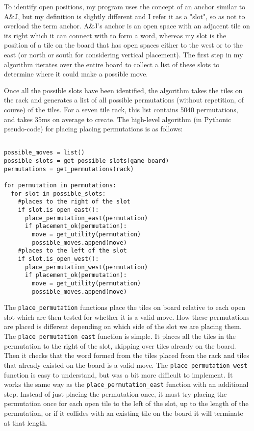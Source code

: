 \documentclass[letterpaper]{article}
\begin{document}
To identify open positions, my program uses the concept of an anchor similar to A\&J, but my definition is slightly different and I refer it as a "slot", so as not to overload the term anchor. A\&J's anchor is an open space with an adjacent tile on its right which it can connect with to form a word, whereas my slot is the position of a tile on the board that has open spaces either to the west or to the east (or north or south for considering vertical placement). The first step in my algorithm iterates over the entire board to collect a list of these slots to determine where it could make a possible move.

Once all the possible slots have been identified, the algorithm takes the tiles on the rack and generates a list of all possible permutations (without repetition, of course) of the tiles. For a seven tile rack, this list contains 5040 permutations, and takes 35ms on average to create. The high-level algorithm (in Pythonic pseudo-code) for placing placing permutations is as follows:

\lstset{language=Python}
\begin{lstlisting}[frame=single, breaklines=true]  % Start your code-block

possible_moves = list()
possible_slots = get_possible_slots(game_board)
permutations = get_permutations(rack)

for permutation in permutations:
  for slot in possible_slots:
    #places to the right of the slot
    if slot.is_open_east():
      place_permutation_east(permutation)
      if placement_ok(permutation):
        move = get_utility(permutation)
        possible_moves.append(move)
    #places to the left of the slot
    if slot.is_open_west():
      place_permutation_west(permutation)
      if placement_ok(permutation):
        move = get_utility(permutation)
        possible_moves.append(move)
\end{lstlisting}



The \texttt{place\_permutation} functions place the tiles on board relative to each open slot which are then tested for whether it is a valid move. How these permutations are placed is different depending on which side of the slot we are placing them. The \texttt{place\_permutation\_east} function is simple. It places all the tiles in the permutation to the right of the slot, skipping over tiles already on the board. Then it checks that the word formed from the tiles placed from the rack and tiles that already existed on the board is a valid move. The \texttt{place\_permutation\_west} function is easy to understand, but was a bit more difficult to implement. It works the same way as the \texttt{place\_permutation\_east} function with an additional step. Instead of just placing the permutation once, it must try placing the permutation once for each open tile to the left of the slot, up to the length of the permutation, or if it collides with an existing tile on the board it will terminate at that length.
\end{document}

